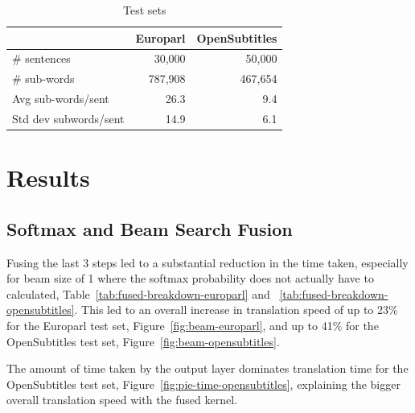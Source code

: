 \documentclass[11pt,a4paper]{article}
\begin{document}
\begin{table}
\begin{center}
\small
\begin{tabular}{|l|r|r|} \hline
		  & Europarl		& OpenSubtitles \\ \hline
\# sentences  	  & 30,000 		& 50,000 \\
\# sub-words 	  & 787,908 		& 467,654 \\ 
Avg sub-words/sent & 26.3		& 9.4 \\
Std dev subwords/sent & 14.9		& 6.1 \\ \hline
\end{tabular}
\end{center}
\caption{Test sets}
\label{tab:corpora}
\end{table}


\section{Results}
\label{sec:Results}

\subsection{Softmax and Beam Search Fusion}

Fusing the last 3 steps led to a substantial reduction in the time taken, especially for beam size of 1 where the softmax probability does not actually have to calculated, Table~\ref{tab:fused-breakdown-europarl} and ~\ref{tab:fused-breakdown-opensubtitles}. This led to an overall increase in translation speed of up to 23\% for the Europarl test set, Figure~\ref{fig:beam-europarl}, and up to 41\% for the OpenSubtitles test set, Figure~\ref{fig:beam-opensubtitles}. 

The amount of time taken by the output layer dominates translation time for the OpenSubtitles test set, Figure~\ref{fig:pie-time-opensubtitles}, explaining the bigger overall translation speed with the fused kernel.
\end{document}
